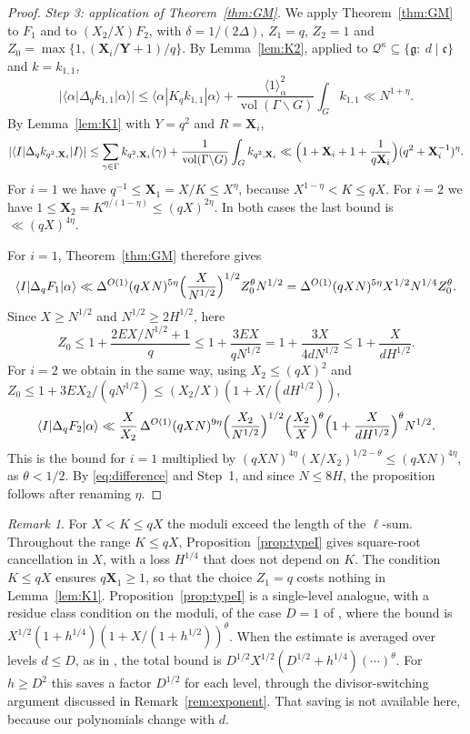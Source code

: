 \documentclass[11pt]{amsart}
\theoremstyle{remark}
\newtheorem{remark}[theorem]{Remark}
\theoremstyle{definition}
\numberwithin{equation}{section}
\newcommand{\Qc}{\mathcal{Q}}
\newcommand{\gc}{\mathfrak{c}}
\newcommand{\fg}{\mathfrak{g}}
\newcommand{\bX}{\mathbf{X}}
\newcommand{\bY}{\mathbf{Y}}
\newcommand{\vol}{\operatorname{vol}}
\newcommand{\br}[1]{\langle #1\rangle}
\begin{document}
\begin{proof}
\emph{Step 3: application of Theorem~\ref{thm:GM}.} We apply Theorem~\ref{thm:GM} to $F_1$ and to $(X_2/X)F_2$, with $\delta=1/(2\Delta)$, $Z_1=q$, $Z_2=1$ and $Z_0=\max\{1,(\bX_i/\bY+1)/q\}$. By Lemma~\ref{lem:K2}, applied to $\Qc^\kappa\subseteq\{\fg:\ d\mid\gc\}$ and $k=k_{1,1}$,
\[
|\br{\alpha|\Delta_qk_{1,1}|\alpha}|\le\br{\alpha|K_qk_{1,1}|\alpha}+\frac{\br1_\alpha^2}{\vol(\Gamma\backslash G)}\int_Gk_{1,1}\ll N^{1+\eta}.
\]
By Lemma~\ref{lem:K1} with $Y=q^2$ and $R=\bX_i$,
\[
|\br{I|\Delta_qk_{q^2,\bX_i}|I}|\le\sum_{\gamma\in\Gamma}k_{q^2,\bX_i}(\gamma)+\frac{1}{\vol(\Gamma\backslash G)}\int_Gk_{q^2,\bX_i}\ll\Bigl(1+\bX_i+1+\frac1{q\bX_i}\Bigr)(q^2+\bX_i^{-1})^{\eta}.
\]
For $i=1$ we have $q^{-1}\le\bX_1=X/K\le X^{\eta}$, because $X^{1-\eta}<K\le qX$. For $i=2$ we have $1\le\bX_2=K^{\eta/(1-\eta)}\le(qX)^{2\eta}$. In both cases the last bound is $\ll(qX)^{4\eta}$.

For $i=1$, Theorem~\ref{thm:GM} therefore gives
\[
\br{I|\Delta_qF_1|\alpha}\ll\Delta^{O(1)}(qXN)^{5\eta}\Bigl(\frac{X}{N^{1/2}}\Bigr)^{1/2}Z_0^{\theta}N^{1/2}=\Delta^{O(1)}(qXN)^{5\eta}X^{1/2}N^{1/4}Z_0^\theta .
\]
Since $X\ge N^{1/2}$ and $N^{1/2}\ge2H^{1/2}$, here
\[
Z_0\le1+\frac{2EX/N^{1/2}+1}{q}\le1+\frac{3EX}{qN^{1/2}}=1+\frac{3X}{4dN^{1/2}}\le1+\frac X{dH^{1/2}} .
\]
For $i=2$ we obtain in the same way, using $X_2\le(qX)^2$ and $Z_0\le1+3EX_2/(qN^{1/2})\le(X_2/X)(1+X/(dH^{1/2}))$,
\[
\br{I|\Delta_qF_2|\alpha}\ll\frac X{X_2}\,\Delta^{O(1)}(qXN)^{9\eta}\Bigl(\frac{X_2}{N^{1/2}}\Bigr)^{1/2}\Bigl(\frac{X_2}X\Bigr)^{\theta}\Bigl(1+\frac X{dH^{1/2}}\Bigr)^\theta N^{1/2}.
\]
This is the bound for $i=1$ multiplied by $(qXN)^{4\eta}(X/X_2)^{1/2-\theta}\le(qXN)^{4\eta}$, as $\theta<1/2$. By \eqref{eq:difference} and Step~1, and since $N\le8H$, the proposition follows after renaming $\eta$.
\end{proof}

\begin{remark}\label{rem:typeI}
For $X<K\le qX$ the moduli exceed the length of the $\ell$-sum. Throughout the range $K\le qX$, Proposition~\ref{prop:typeI} gives square-root cancellation in $X$, with a loss $H^{1/4}$ that does not depend on $K$. The condition $K\le qX$ ensures $q\bX_1\ge1$, so that the choice $Z_1=q$ costs nothing in Lemma~\ref{lem:K1}. Proposition~\ref{prop:typeI} is a single-level analogue, with a residue class condition on the moduli, of the case $D=1$ of \cite[Theorem~1.4]{GM}, where the bound is $X^{1/2}(1+h^{1/4})(1+X/(1+h^{1/2}))^\theta$. When the estimate is averaged over levels $d\le D$, as in \cite[Theorem~1.4]{GM}, the total bound is $D^{1/2}X^{1/2}(D^{1/2}+h^{1/4})(\cdots)^\theta$. For $h\ge D^2$ this saves a factor $D^{1/2}$ for each level, through the divisor-switching argument discussed in Remark~\ref{rem:exponent}. That saving is not available here, because our polynomials change with $d$.
\end{remark}
\end{document}
